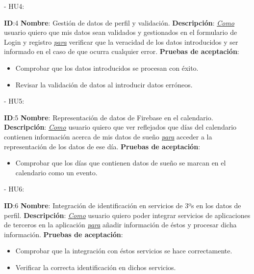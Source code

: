 \documentclass[11pt,openany]{book}
\begin{document}
- HU4:
 
\textbf{ID}:4 \textbf{Nombre}: Gestión de datos de perfil y validación.\linebreak
\textbf{Descripción}: \textit{\underline{Como}} usuario quiero que mis datos sean validados y gestionados en el formulario de Login y registro \textit{\underline{para}} verificar que la veracidad de los datos introducidos y ser informado en el caso de que ocurra cualquier error.\linebreak
\textbf{Pruebas de aceptación}:
\begin{itemize}
\item Comprobar que los datos introducidos se procesan con éxito.
\item Revisar la validación de datos al introducir datos erróneos.
\end{itemize}
 
- HU5:
 
\textbf{ID}:5 \textbf{Nombre}: Representación de datos de Firebase en el calendario.\linebreak
\textbf{Descripción}: \textit{\underline{Como}} usuario quiero que ver reflejados que días del calendario contienen información acerca de mis datos de sueño \textit{\underline{para}} acceder a la representación de los datos de ese día.\linebreak
\textbf{Pruebas de aceptación}:
\begin{itemize}
\item Comprobar que los días que contienen datos de sueño se marcan en el calendario como un evento.
\end{itemize}
 


- HU6:
 
\textbf{ID}:6 \textbf{Nombre}: Integración de identificación en servicios de 3ºs en los datos de perfil.\linebreak
\textbf{Descripción}: \textit{\underline{Como}} usuario quiero poder integrar servicios de aplicaciones de terceros en la aplicación \textit{\underline{para}} añadir información de éstos y procesar dicha información.\linebreak
\textbf{Pruebas de aceptación}:
\begin{itemize}
\item Comprobar que la integración con éstos servicios se hace correctamente.
\item Verificar la correcta identificación en dichos servicios.
\end{itemize}
 
\end{document}
